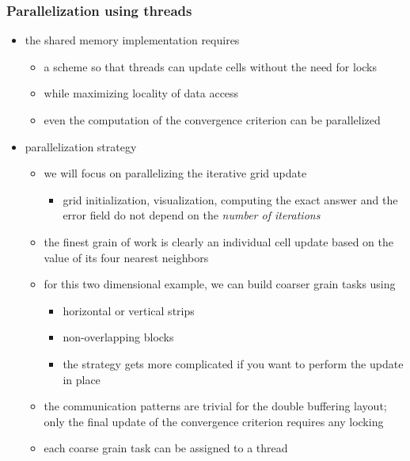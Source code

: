 %
%
%
%


\begin{frame}[fragile]
%
  \frametitle{Parallelization using threads}
%
  \begin{itemize}
%
  \item the shared memory implementation requires
    \begin{itemize}
    \item a scheme so that threads can update cells without the need for locks
    \item while maximizing locality of data access
    \item even the computation of the convergence criterion can be parallelized
    \end{itemize}
%
  \item parallelization strategy
    \begin{itemize}
    \item we will focus on parallelizing the iterative grid update
      \begin{itemize}
      \item grid initialization, visualization, computing the exact answer and the error field
        do not depend on the {\em number of iterations}
      \end{itemize}
    \item the finest grain of work is clearly an individual cell update based on the value of
      its four nearest neighbors
    \item for this two dimensional example, we can build coarser grain tasks using
      \begin{itemize}
      \item horizontal or vertical strips
      \item non-overlapping blocks
      \item the strategy gets more complicated if you want to perform the update in place
      \end{itemize}
    \item the communication patterns are trivial for the double buffering layout; only the
      final update of the convergence criterion requires any locking
    \item each coarse grain task can be assigned to a thread
    \end{itemize}
%
  \end{itemize}
% 
\end{frame}


